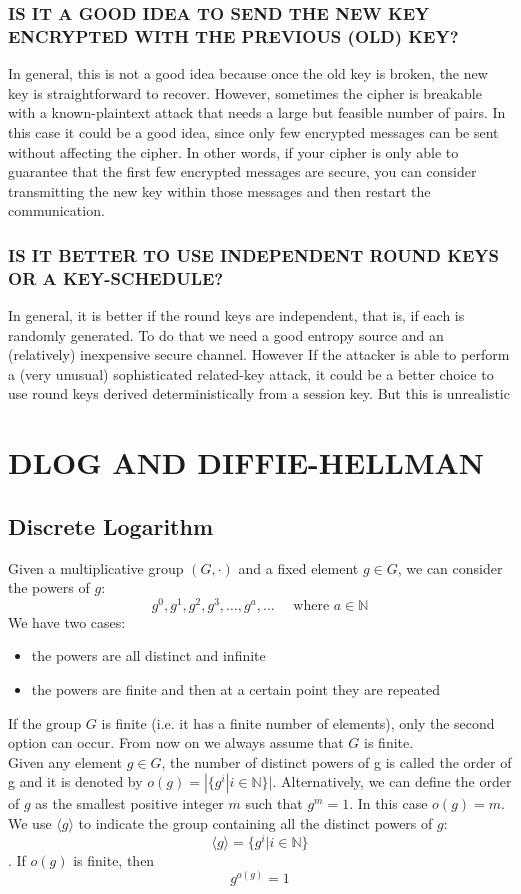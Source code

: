 \documentclass[a4paper, 10pt, titlepage]{article}
\begin{document}
\subsubsection*{IS IT A GOOD IDEA TO SEND THE NEW KEY ENCRYPTED WITH THE PREVIOUS (OLD) KEY?}
In general, this is not a good idea because once the old key is broken, the new key is straightforward to recover.
However, sometimes the cipher is breakable with a known-plaintext attack that needs a large but feasible number of pairs. In this case it could be a good idea, since only few encrypted messages can be sent without affecting the cipher. In other words, if your cipher is only able to guarantee that the first few encrypted messages are secure, you can consider transmitting the new key within those messages and then restart the communication.

\subsubsection*{IS IT BETTER TO USE INDEPENDENT ROUND KEYS OR A KEY-SCHEDULE?}
In general, it is better if the round keys are independent, that is, if each is randomly generated. To do that we need a good entropy source and an (relatively) inexpensive secure channel.
However If the attacker is able to perform a (very unusual) sophisticated related-key attack, it could be a better choice to use round keys derived deterministically from a session key. But this is unrealistic

\newpage
\section{DLOG AND DIFFIE-HELLMAN}
\subsection{Discrete Logarithm}
Given a multiplicative group $(G , \cdot)$ and a fixed element $g \in G$, we can consider the powers of $g$:
$$g^0, g^1, g^2, g^3, \dots , g^a, \dots \quad \text{ where } a \in \mathbb{N}$$
We have two cases:
\begin{itemize}
\item the powers are all distinct and infinite
\item the powers are finite and then at a certain point they are repeated
\end{itemize}
If the group $G$ is finite (i.e. it has a finite number of elements), only the second option can occur. From now on we always assume that $G$ is finite. \\
Given any element $g \in G$, the number of distinct powers of g is called the order of g and it is denoted by $o(g) = |\{g^i | i \in \mathbb{N}\}|$.
Alternatively, we can define the order of $g$ as the smallest positive integer $m$ such that $g^m = 1$. In this case $o(g) = m$.
We use $\langle g \rangle$ to indicate the group containing all the distinct powers of $g$:
$$\langle g \rangle = \{g^i | i \in \mathbb{N}\}$$.
If $o(g)$ is finite, then 
$$g^{o(g)} = 1$$
\end{document}
